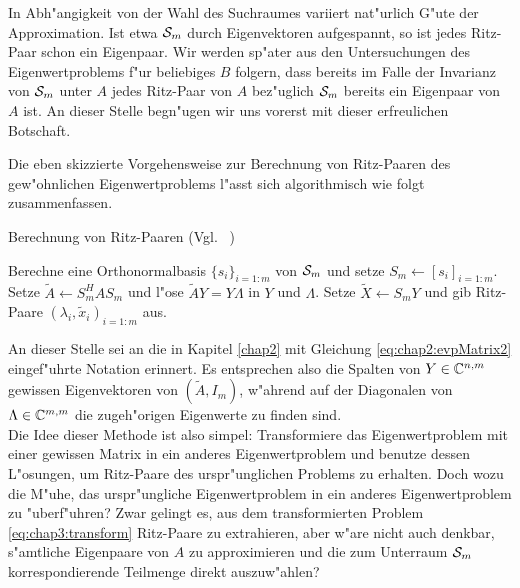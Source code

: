 In Abh"angigkeit von der Wahl
des Suchraumes variiert nat"urlich G"ute der Approximation. Ist etwa $\S_m$
durch Eigenvektoren aufgespannt, so ist jedes Ritz-Paar schon ein Eigenpaar.
Wir werden sp"ater aus den Untersuchungen des Eigenwertproblems f"ur beliebiges $B$ folgern,
dass bereits im Falle der Invarianz von $\S_m$ unter $A$ jedes Ritz-Paar von $A$ bez"uglich $\S_m$ bereits ein Eigenpaar von $A$ ist.
An dieser Stelle begn"ugen wir uns vorerst mit dieser erfreulichen Botschaft.

\newpage

Die eben skizzierte Vorgehensweise zur Berechnung von Ritz-Paaren des gew"ohnlichen Eigenwertproblems
l"asst sich algorithmisch wie folgt zusammenfassen.

\begin{algorithm}
\caption{Berechnung von Ritz-Paaren (Vgl. ~\cite[98]{saad})}\label{alg:chap3:rp}
\begin{algorithmic}[1]
\State Berechne eine Orthonormalbasis $\{s_i\}_{i=1:m}$ von $\S_m$ und setze $S_m\gets[s_i]_{i=1:m}$.
\State Setze $\widetilde{A}\gets S_m^H A S_m$ und
l"ose $\widetilde{A}Y = Y \Lambda$ in $Y$ und
$\Lambda$.
\State Setze $\widetilde{X} \gets S_m Y$ und gib Ritz-Paare $(\lambda_i, \widetilde{x}_i)_{i=1:m}$ aus.
\end{algorithmic}
\end{algorithm}

An dieser Stelle sei an die in Kapitel \ref{chap2}  mit Gleichung \eqref{eq:chap2:evpMatrix2} eingef"uhrte Notation erinnert. Es entsprechen also die Spalten von $Y\in\C^{n,m}$ gewissen Eigenvektoren von $(\widetilde{A}, I_m)$, w"ahrend auf der Diagonalen von $\Lambda\in\C^{m,m}$
die zugeh"origen Eigenwerte zu finden sind.\\

Die Idee dieser Methode ist also simpel: Transformiere das Eigenwertproblem mit
einer gewissen Matrix in ein anderes Eigenwertproblem und benutze dessen L"osungen,
um Ritz-Paare des urspr"unglichen Problems zu erhalten.
Doch wozu die M"uhe, das urspr"ungliche Eigenwertproblem in ein anderes
Eigenwertproblem zu "uberf"uhren? Zwar gelingt es, aus dem transformierten Problem
\eqref{eq:chap3:transform} Ritz-Paare zu extrahieren, aber w"are nicht auch denkbar,
s"amtliche Eigenpaare von $A$ zu approximieren und die zum Unterraum $\S_m$
korrespondierende Teilmenge direkt auszuw"ahlen?\\

